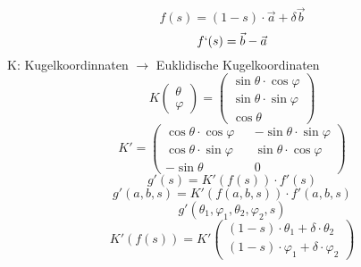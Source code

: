 \begin{equation}
f(s)=(1-s)\cdot\vec{a}+\delta\vec{b}
\end{equation}
\begin{equation}
    f`(s)=\vec{b}-\vec{a}
\end{equation}
K: Kugelkoordinnaten $\rightarrow$ Euklidische Kugelkoordinaten\\
\begin{equation*}
    K\begin{pmatrix}\theta\\\varphi\end{pmatrix}=
    \begin{pmatrix}
        \sin\theta\cdot\cos\varphi \\
        \sin\theta\cdot\sin\varphi \\
        \cos\theta
    \end{pmatrix}
\end{equation*}
\begin{equation}
    K'=
    \begin{pmatrix}
       \cos\theta\cdot\cos\varphi && -\sin\theta\cdot\sin\varphi \\
       \cos\theta\cdot\sin\varphi && \sin\theta\cdot\cos\varphi \\
       -\sin\theta && 0
    \end{pmatrix}
\end{equation}
\begin{equation}
    g'(s) = K'(f(s))\cdot f'(s)
\end{equation}
\begin{equation}
    g'(a,b,s) = K'(f(a,b,s))\cdot f'(a,b,s)
\end{equation}
\begin{equation}
    g'(\theta_1,\varphi_1,\theta_2,\varphi_2,s)
\end{equation}
\begin{equation}
    K'(f(s))=K'
    \begin{pmatrix}
        (1-s)\cdot\theta_1 + \delta\cdot\theta_2 \\
        (1-s)\cdot\varphi_1 + \delta\cdot\varphi_2
    \end{pmatrix}
\end{equation}

